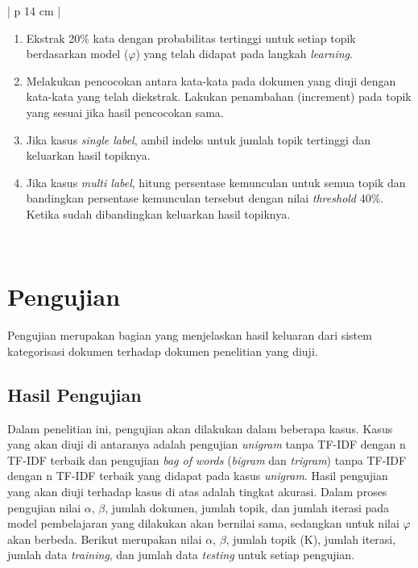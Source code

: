 \begin{enumerate}[nolistsep,leftmargin=0.5cm]
\begin{table}[H]
\small
\centering
\begin{adjustbox}{width=1\textwidth}
\begin{tabular}{| p {14 cm} |}
\hline
\begin{enumerate}[nolistsep,leftmargin=0.7cm]
\item
Ekstrak 20\% kata dengan probabilitas tertinggi untuk setiap topik berdasarkan model ($\varphi$) yang telah didapat pada langkah {\itshape learning}.
\item
Melakukan pencocokan antara kata-kata pada dokumen yang diuji dengan kata-kata yang telah diekstrak. Lakukan penambahan (increment) pada topik yang sesuai jika hasil pencocokan sama.
\item
Jika kasus {\itshape single label}, ambil indeks untuk jumlah topik tertinggi dan keluarkan hasil topiknya.
\item
Jika kasus {\itshape multi label}, hitung persentase kemunculan untuk semua topik dan bandingkan persentase kemunculan tersebut dengan nilai {\itshape threshold} 40\%. Ketika sudah dibandingkan keluarkan hasil topiknya.
\end{enumerate} \\
\hline
\end{tabular}
\end{adjustbox}
\end{table}

\end{enumerate}

\section{Pengujian}
\indent
Pengujian merupakan bagian yang menjelaskan hasil keluaran dari sistem kategorisasi dokumen terhadap dokumen penelitian yang diuji.

\subsection{Hasil Pengujian}
\indent
Dalam penelitian ini, pengujian akan dilakukan dalam beberapa kasus. Kasus yang akan diuji di antaranya adalah pengujian {\itshape unigram} tanpa TF-IDF dengan n TF-IDF terbaik dan pengujian {\itshape bag of words} ({\itshape bigram} dan {\itshape trigram}) tanpa TF-IDF dengan n TF-IDF terbaik yang didapat pada kasus {\itshape unigram}. Hasil pengujian yang akan diuji terhadap kasus di atas adalah tingkat akurasi. Dalam proses pengujian nilai $\alpha$, $\beta$, jumlah dokumen, jumlah topik, dan jumlah iterasi pada model pembelajaran yang dilakukan akan bernilai sama, sedangkan untuk nilai $\varphi$ akan berbeda. Berikut merupakan nilai $\alpha$, $\beta$, jumlah topik (K), jumlah iterasi, jumlah data {\itshape training}, dan jumlah data {\itshape testing} untuk setiap pengujian.

